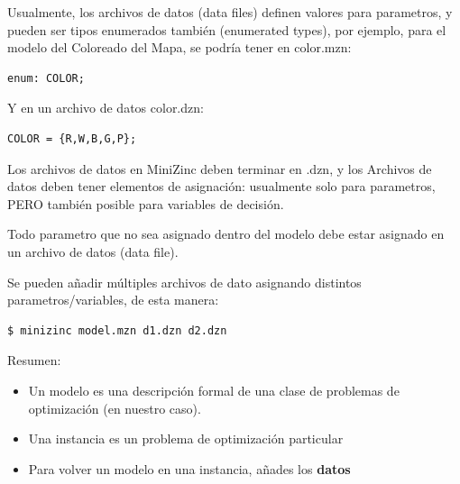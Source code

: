 \documentclass[12pt]{article}
\begin{document}
\begin{justify}
Usualmente, los archivos de datos (data files) definen valores para parametros, y pueden ser tipos enumerados también (enumerated types), por ejemplo, para el modelo del Coloreado del Mapa, se podría tener en color.mzn:
\end{justify}

\begin{Verbatim}
enum: COLOR;
\end{Verbatim}

\begin{justify}
Y en un archivo de datos color.dzn:
\end{justify}

\begin{Verbatim}
COLOR = {R,W,B,G,P};
\end{Verbatim}

\begin{justify}
Los archivos de datos en MiniZinc deben terminar en .dzn, y los Archivos de datos deben tener elementos de asignación: usualmente solo para parametros, PERO también posible para variables de decisión.
\end{justify}

\begin{justify}
Todo parametro que no sea asignado dentro del modelo debe estar asignado en un archivo de datos (data file).
\end{justify}

\begin{justify}
Se pueden añadir múltiples archivos de dato asignando distintos parametros/variables, de esta manera:
\end{justify}

\begin{Verbatim}
$ minizinc model.mzn d1.dzn d2.dzn
\end{Verbatim}

\begin{justify}
Resumen:
\end{justify}

\begin{itemize}
\item Un modelo es una descripción formal de una clase de problemas de optimización (en nuestro caso).
\item Una instancia es un problema de optimización particular
\item Para volver un modelo en una instancia, añades los \textbf{datos}
\end{itemize}
\end{document}
